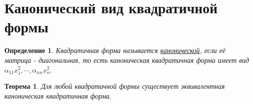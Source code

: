 \documentclass[../../main.tex]{subfiles}
\begin{document}
\section{Канонический вид квадратичной формы}


\newtheorem*{CanonicalDef}{Определение}
\begin{CanonicalDef}
Квадратичная форма называется \underline{канонической}, если её матрица - диагональная,
то есть каноническая квадратичная форма имеет вид $\alpha_{1 1} x^{2}_{1}, \cdots, \alpha_{n n} x^{2}_{n}$.
\end{CanonicalDef}

\newtheorem*{CanonicalViewTheorem}{Теорема}
\begin{CanonicalViewTheorem}
Для любой квадратичной формы существует эквивалентная каноническая квадратичная форма.
\end{CanonicalViewTheorem}
\end{document}
